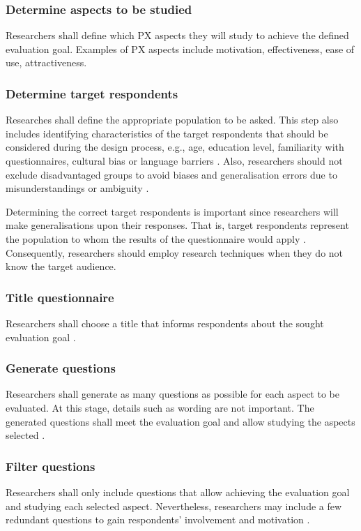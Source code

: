 \subsubsection{Determine aspects to be studied} 
Researchers shall define which \ac{PX} aspects they will study to achieve the defined evaluation goal. Examples of \ac{PX} aspects include motivation, effectiveness, ease of use, attractiveness.

\subsubsection{Determine target respondents}
Researches shall define the appropriate population to be asked. This step also includes identifying characteristics of the target respondents that should be considered during the design process, e.g., age, education level, familiarity with questionnaires, cultural bias or language barriers \cite{Diem,Crawford1997}. Also, researchers should not exclude disadvantaged groups to avoid biases and generalisation errors due to misunderstandings or ambiguity \cite{Boynton2004b}.

Determining the correct target respondents is important since researchers will make generalisations upon their responses. That is, target respondents represent the population to whom the results of the questionnaire would apply \cite{Crawford1997,Diem}. Consequently, researchers should employ research techniques when they do not know the target audience.

\subsubsection{Title questionnaire}
Researchers shall choose a title that informs respondents about the sought evaluation goal \cite{Diem}.

\subsubsection{Generate questions}
Researchers shall generate as many questions as possible for each aspect to be evaluated. At this stage, details such as wording are not important. The generated questions shall meet the evaluation goal and allow studying the aspects  selected \cite{Crawford1997,Radhakrishna2007}.

\subsubsection{Filter questions}
Researchers shall only include questions that allow achieving the evaluation goal and studying each selected aspect. Nevertheless, researchers may include a few redundant questions to gain respondents' involvement and motivation \cite{Crawford1997}.

